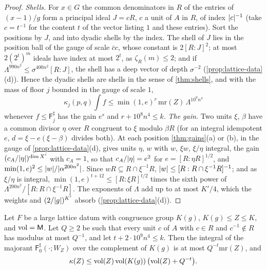 \begin{proof}
\emph{Shells.} For $x\in G$ the common denominators in $R$ of the entries of $(x-1)/g$ form a principal ideal $J=cR$, $c$ a unit of $A$ in $R$, of index $\lvert c\rvert^{-1}$ (take $c=t^{-1}$ for the content $t$ of the vector listing $1$ and these entries). Sort the
positions by $J$, and into dyadic shells by the index. The shell of $J$ lies in the position ball of the gauge of scale $\bar cc$, whose constant is $2[R:J]^2$; at most $2(2^t)^m$ ideals have index at most $2^t$, as $\zeta_R(m)\le2$; and if
$\Lambda^{990n^2}\le\sigma^{400n^2}[R:J]$, the shell has a deep vector of depth $\sigma^{-2}$ (\cref{prop:lattice-data}(d)). Hence the dyadic shells are shells in the sense of \cref{thm:shells}, and with the mass of floor $j$ bounded in the gauge of scale $1$,
\[
  \kappa_j(p,q)\int f\le\min(1,e)^r\,\mathrm{mr}(Z)\,\Lambda^{10^9n^4}
\]
whenever $f\le\mathsf F^\sharp_j$ has the gain $e^s$ and $r+10^8n^4\le k$. \emph{The gain.} Two units $\xi$, $\beta$ have a common divisor $\eta$ over $R$ congruent to $\xi$ modulo $\beta R$ (for an integral idempotent $e$, $d=\xi-e(\xi-\beta)$ divides both).
At each position \cref{thm:gains}(a) or (b), in the gauge of \cref{prop:lattice-data}(d), gives units $\eta$, $w$ with $w$, $\xi w$, $\xi/\eta$ integral, the gain $(c_A/\lvert \eta\rvert)^{\dim X'}$ with $c_A=1$, so that $c_A/\lvert \eta\rvert=e^2$ for $e=[R:\eta R]^{1/2}$, and
$\min(1,e)^2\le\lvert w\rvert/\lvert \alpha^{200n^2}\rvert$. Since $wR\subseteq R\cap\xi^{-1}R$, $\lvert w\rvert\le[R:R\cap\xi^{-1}R]^{-1}$; and as $\xi/\eta$ is integral, $\min(1,e)^{t+12}\le[R:\xi R]^{t/2}$ times the sixth power of $\Lambda^{200n^2}/[R:R\cap\xi^{-1}R]$. The exponents
of $\Lambda$ add up to at most $K'/4$, which the weights and $(2/\lvert g\rvert)^{K'}$ absorb (\cref{prop:lattice-data}(d)).
\end{proof}

\begin{theorem}\label{thm:finite-mass}
Let $F$ be a large lattice datum with congruence group $K(g)$, $K(g)\le Z\le K$, and $\operatorname{vol}=\mathsf M$. Let $Q\ge2$ be such that every unit $c$ of $A$ with $c\in R$ and $c^{-1}\notin R$ has modulus at most $Q^{-1}$, and let
$t+2\cdot10^9n^4\le k$. Then the integral of the majorant $\mathsf F^\sharp_0(\cdot;W_Z)$ over the complement of $K(g)$ is at most $Q^{-t}\mathrm{mr}(Z)$, and
\[
  \kappa(Z)\le\operatorname{vol}(Z)\operatorname{vol}(K(g))\,\bigl(\operatorname{vol}(Z)+Q^{-t}\bigr).
\]
\end{theorem}

